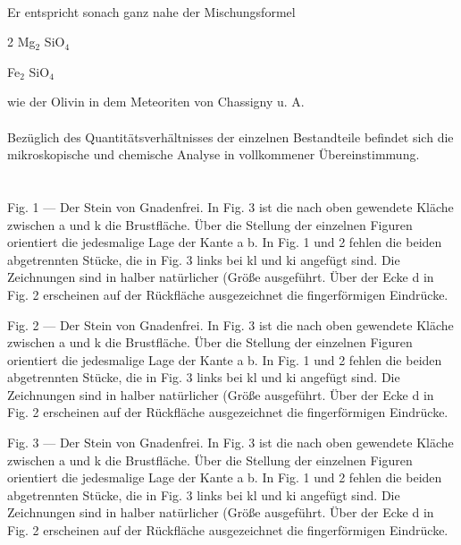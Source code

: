 \documentclass[a4paper, 11pt, oneside]{article}
\begin{document}
\paragraph{}
Er entspricht sonach ganz nahe der Mischungsformel
\begin{center}
2 Mg$_{2}$ SiO$_{4}$
\end{center}
\begin{center}
Fe$_{2}$ SiO$_{4}$
\end{center}
wie der Olivin in dem Meteoriten von Chassigny u. A.
\paragraph{}
Bezüglich des Quantitätsverhältnisses der einzelnen Bestandteile befindet sich die mikroskopische und chemische Analyse in vollkommener Übereinstimmung.
\clearpage
\section{}
\paragraph{}
Fig. 1 --- Der Stein von Gnadenfrei. In Fig. 3 ist die nach oben gewendete Kläche zwischen a und k die Brustfläche. Über die Stellung der einzelnen Figuren orientiert die jedesmalige Lage der Kante a b. In Fig. 1 und 2 fehlen die beiden abgetrennten Stücke, die in Fig. 3 links bei kl und ki angefügt sind. Die Zeichnungen sind in halber natürlicher (Größe ausgeführt. Über der Ecke d in Fig. 2 erscheinen auf der Rückfläche ausgezeichnet die fingerförmigen Eindrücke.

Fig. 2 --- Der Stein von Gnadenfrei. In Fig. 3 ist die nach oben gewendete Kläche zwischen a und k die Brustfläche. Über die Stellung der einzelnen Figuren orientiert die jedesmalige Lage der Kante a b. In Fig. 1 und 2 fehlen die beiden abgetrennten Stücke, die in Fig. 3 links bei kl und ki angefügt sind. Die Zeichnungen sind in halber natürlicher (Größe ausgeführt. Über der Ecke d in Fig. 2 erscheinen auf der Rückfläche ausgezeichnet die fingerförmigen Eindrücke.

Fig. 3 --- Der Stein von Gnadenfrei. In Fig. 3 ist die nach oben gewendete Kläche zwischen a und k die Brustfläche. Über die Stellung der einzelnen Figuren orientiert die jedesmalige Lage der Kante a b. In Fig. 1 und 2 fehlen die beiden abgetrennten Stücke, die in Fig. 3 links bei kl und ki angefügt sind. Die Zeichnungen sind in halber natürlicher (Größe ausgeführt. Über der Ecke d in Fig. 2 erscheinen auf der Rückfläche ausgezeichnet die fingerförmigen Eindrücke.
\end{document}
